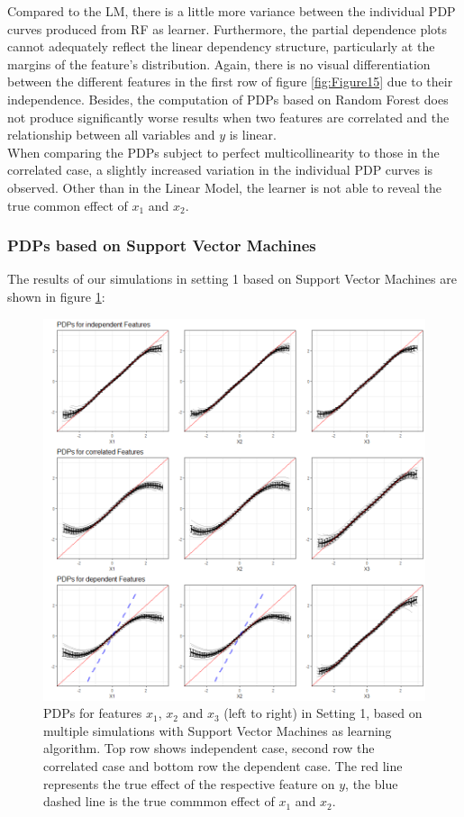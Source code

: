 \documentclass[]{krantz}
\begin{document}
Compared to the LM, there is a little more variance between the
individual PDP curves produced from RF as learner. Furthermore, the
partial dependence plots cannot adequately reflect the linear dependency
structure, particularly at the margins of the feature's distribution.
Again, there is no visual differentiation between the different features
in the first row of figure \ref{fig:Figure15} due to their independence.
Besides, the computation of PDPs based on Random Forest does not produce
significantly worse results when two features are correlated and the
relationship between all variables and \(y\) is linear.\\
When comparing the PDPs subject to perfect multicollinearity to those in
the correlated case, a slightly increased variation in the individual
PDP curves is observed. Other than in the Linear Model, the learner is
not able to reveal the true common effect of \(x_1\) and \(x_2\).

\subsubsection{PDPs based on Support Vector
Machines}\label{pdps-based-on-support-vector-machines}

The results of our simulations in setting 1 based on Support Vector
Machines are shown in figure \ref{fig:Figure16}:

\begin{figure}

\includegraphics[width=1\linewidth]{images/VK_PDP_16_Set1_SVM} \hfill{}

\caption{PDPs for features $x_1$, $x_2$ and $x_3$ (left to right) in Setting 1, based on multiple simulations with Support Vector Machines as learning algorithm. Top row shows independent case, second row the correlated case and bottom row the dependent case. The red line represents the true effect of the respective feature on $y$, the blue dashed line is the true commmon effect of $x_1$ and $x_2$.}\label{fig:Figure16}
\end{figure}
\end{document}
